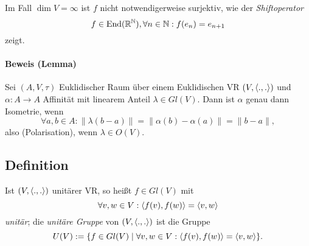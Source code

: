 	Im Fall $ \dim V = \infty $ ist $ f $ nicht notwendigerweise surjektiv, wie der \emph{Shiftoperator}
		\[ f\in \operatorname{End}(\mathbb{R}^{\mathbb{N}}), \forall n\in \mathbb{N}: f(e_n) = e_{n+1} \]
	zeigt.
\paragraph{Beweis (Lemma)}
	Sei $ (A,V,\tau) $ Euklidischer Raum über einem Euklidischen VR $ (V,\langle .,. \rangle) $ und $\alpha:A\to A $ Affinität mit linearem Anteil $ \lambda\in Gl(V) $. Dann ist $ \alpha $ genau dann Isometrie, wenn
		\[ \forall a,b\in A: \|\lambda(b-a)\| = \|\alpha(b)-\alpha(a)\| = \|b-a\|,  \]
	also (Polarisation), wenn $ \lambda\in O(V) $.
\subsection{Definition}
\begin{Definition}
	Ist $ (V,\langle .,. \rangle) $ unitärer VR, so heißt $ f\in Gl(V) $ mit
		\[ \forall v,w\in V: \langle f(v),f(w) \rangle = \langle v,w \rangle \]
	\emph{unitär}; die \emph{unitäre Gruppe} von $ (V,\langle .,. \rangle) $ ist die Gruppe
		\[ U(V) := \{f\in Gl(V)\mid \forall v,w\in V: \langle f(v),f(w) \rangle = \langle v,w \rangle \}. \]
\end{Definition}